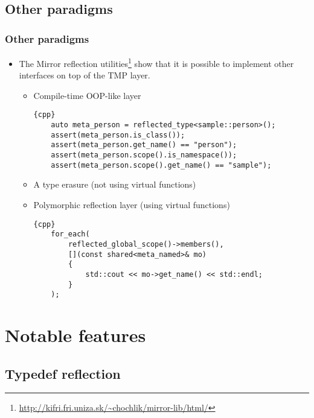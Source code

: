 \documentclass[compress,table,xcolor=table]{beamer}
\begin{document}
\subsection{Other paradigms}
\begin{frame}[fragile]
\frametitle{Other paradigms}
  \begin{itemize}
    \item The Mirror reflection utilities\footnote
      {\tiny{\url{http://kifri.fri.uniza.sk/~chochlik/mirror-lib/html/}}}
      show that it is possible to implement other interfaces on top of the TMP layer.
      \begin{itemize}
        \small
        \item Compile-time OOP-like layer
        \begin{lstlisting}{cpp}
	auto meta_person = reflected_type<sample::person>();
	assert(meta_person.is_class());
	assert(meta_person.get_name() == "person");
	assert(meta_person.scope().is_namespace());
	assert(meta_person.scope().get_name() == "sample");
        \end{lstlisting}
	\item A type erasure (not using virtual functions)
	\item Polymorphic reflection layer (using virtual functions)
        \begin{lstlisting}{cpp}
	for_each(
	    reflected_global_scope()->members(),
	    [](const shared<meta_named>& mo)
	    {
	        std::cout << mo->get_name() << std::endl;
	    }
	);
        \end{lstlisting}
      \end{itemize}
  \end{itemize}
\end{frame}

\section{Notable features}

\subsection{Typedef reflection}
\end{document}
